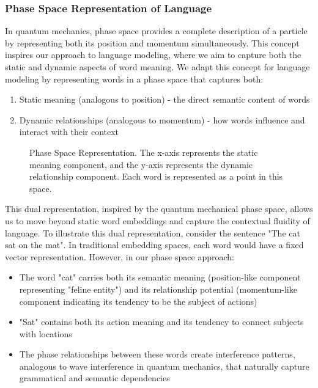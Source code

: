 \documentclass[twocolumn]{article}
\begin{document}
\subsubsection{Phase Space Representation of Language}
In quantum mechanics, phase space provides a complete description of a particle by representing both its position and momentum simultaneously. This concept inspires our approach to language modeling, where we aim to capture both the static and dynamic aspects of word meaning. We adapt this concept for language modeling by representing words in a phase space that captures both:
\begin{enumerate}
    \item Static meaning (analogous to position) - the direct semantic content of words
    \item Dynamic relationships (analogous to momentum) - how words influence and interact with their context
\end{enumerate}

\begin{figure}[h]
    \centering
    \caption{Phase Space Representation. The x-axis represents the static meaning component, and the y-axis represents the dynamic relationship component. Each word is represented as a point in this space.}
\end{figure}

This dual representation, inspired by the quantum mechanical phase space, allows us to move beyond static word embeddings and capture the contextual fluidity of language. To illustrate this dual representation, consider the sentence "The cat sat on the mat". In traditional embedding spaces, each word would have a fixed vector representation. However, in our phase space approach:
\begin{itemize}
    \item The word "cat" carries both its semantic meaning (position-like component representing "feline entity") and its relationship potential (momentum-like component indicating its tendency to be the subject of actions)
    \item "Sat" contains both its action meaning and its tendency to connect subjects with locations
    \item The phase relationships between these words create interference patterns, analogous to wave interference in quantum mechanics, that naturally capture grammatical and semantic dependencies
\end{itemize}
\end{document}
